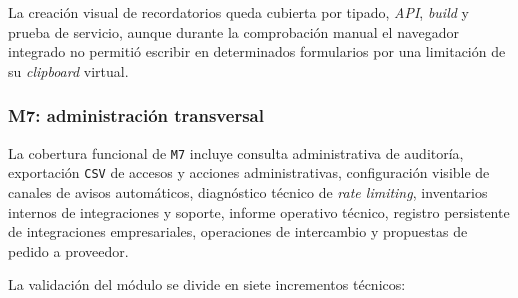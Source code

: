 La creación visual de recordatorios queda cubierta por tipado, \textit{API}, \textit{build} y prueba de servicio, aunque durante la comprobación manual el navegador integrado no permitió escribir en determinados formularios por una limitación de su \textit{clipboard} virtual.

\subsubsection{M7: administración transversal}

La cobertura funcional de \texttt{M7} incluye consulta administrativa de auditoría, exportación \texttt{CSV} de accesos y acciones administrativas, configuración visible de canales de avisos automáticos, diagnóstico técnico de \textit{rate limiting}, inventarios internos de integraciones y soporte, informe operativo técnico, registro persistente de integraciones empresariales, operaciones de intercambio y propuestas de pedido a proveedor.

La validación del módulo se divide en siete incrementos técnicos:

